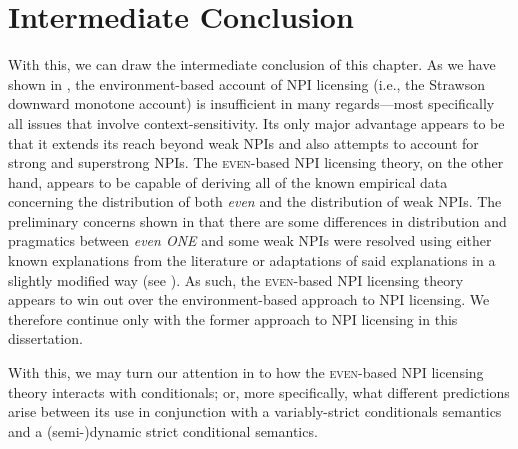 \section{Intermediate Conclusion}
With this, we can draw the intermediate conclusion of this chapter. As we have shown in , the environment-based account of NPI licensing (i.e., the Strawson downward monotone account) is insufficient in many regards---most specifically all issues that involve context-sensitivity. Its only major advantage appears to be that it extends its reach beyond weak NPIs and also attempts to account for strong and superstrong NPIs. The {\scshape even}-based NPI licensing theory, on the other hand, appears to be capable of deriving all of the known empirical data concerning the distribution of both \textit{even} and the distribution of weak NPIs. The preliminary concerns shown in  that there are some differences in distribution and pragmatics between \textit{even \MakeUppercase{one}} and some weak NPIs were resolved using either known explanations from the literature \parencite{Crnic2011,Crnic2014-dogma,Crnic2014-nm,Jeong2021,Jeong2022} or adaptations of said explanations in a slightly modified way (see ). As such, the {\scshape even}-based NPI licensing theory appears to win out over the environment-based approach to NPI licensing. We therefore continue only with the former approach to NPI licensing in this dissertation.

With this, we may turn our attention in  to how the {\scshape even}-based NPI licensing theory interacts with conditionals; or, more specifically, what different predictions arise between its use in conjunction with a variably-strict conditionals semantics and a (semi-)dynamic strict conditional semantics.